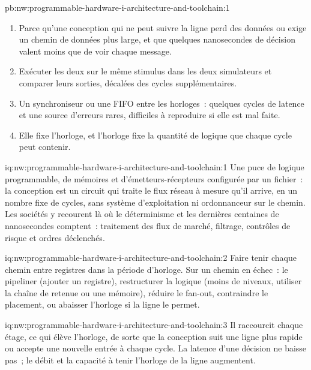 \begin{solution}{pb:nw:programmable-hardware-i-architecture-and-toolchain:1}
\begin{enumerate}
\item Parce qu'une conception qui ne peut suivre la ligne perd des données ou exige un chemin de données plus large, et que quelques nanosecondes de décision valent
  moins que de voir chaque message.
\item Exécuter les deux sur le même stimulus dans les deux simulateurs et comparer leurs sorties, décalées des cycles supplémentaires.
\item Un synchroniseur ou une FIFO entre les horloges~: quelques cycles de latence et une source d'erreurs rares, difficiles à reproduire si elle est mal faite.
\item Elle fixe l'horloge, et l'horloge fixe la quantité de logique que chaque cycle peut contenir.
\end{enumerate}
\end{solution}

\begin{solution}{iq:nw:programmable-hardware-i-architecture-and-toolchain:1}
Une puce de logique programmable, de mémoires et d'émetteurs-récepteurs configurée par un fichier~: la conception est un circuit qui traite le flux réseau
à mesure qu'il arrive, en un nombre fixe de cycles, sans système d'exploitation ni ordonnanceur sur le chemin. Les sociétés y recourent là où le déterminisme et les dernières
centaines de nanosecondes comptent~: traitement des flux de marché, filtrage, contrôles de risque et ordres déclenchés.
\end{solution}

\begin{solution}{iq:nw:programmable-hardware-i-architecture-and-toolchain:2}
Faire tenir chaque chemin entre registres dans la période d'horloge. Sur un chemin en échec~: le pipeliner (ajouter un registre), restructurer la logique
(moins de niveaux, utiliser la chaîne de retenue ou une mémoire), réduire le fan-out, contraindre le placement, ou abaisser l'horloge si la ligne le permet.
\end{solution}

\begin{solution}{iq:nw:programmable-hardware-i-architecture-and-toolchain:3}
Il raccourcit chaque étage, ce qui élève l'horloge, de sorte que la conception suit une ligne plus rapide ou accepte une nouvelle entrée à chaque cycle. La latence
d'une décision ne baisse pas~; le débit et la capacité à tenir l'horloge de la ligne augmentent.
\end{solution}


